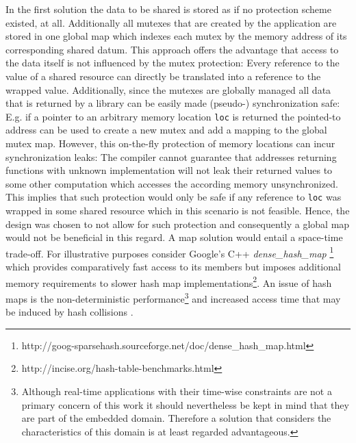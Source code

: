 In the first solution the data to be shared is stored as if no protection scheme existed, at all. Additionally all mutexes that are created by the application are stored in one global map which indexes each mutex by the memory address of its corresponding shared datum. This approach offers the advantage that access to the data itself is not influenced by the mutex protection: Every reference to the value of a shared resource  can directly be translated into a reference to the wrapped value. Additionally, since the mutexes are globally managed all data that is returned by a library can be easily made (pseudo-) synchronization safe: E.g. if a pointer to an arbitrary memory location \texttt{loc} is returned the pointed-to address can be used to create a new mutex and add a mapping to the global mutex map. However, this on-the-fly protection of memory locations can incur synchronization leaks: The compiler cannot guarantee that addresses returning functions with unknown implementation will not leak their returned values to some other computation which accesses the according memory unsynchronized. This implies that such protection would only be safe if any reference to \texttt{loc} was wrapped in some shared resource which in this scenario is not feasible. Hence, the design was chosen to not allow for such protection and consequently a global map would not be beneficial in this regard. A map solution would entail a space-time trade-off. For illustrative purposes consider Google's C++ \textit{dense\_hash\_map} \footnote{http://goog-sparsehash.sourceforge.net/doc/dense\_hash\_map.html} which provides comparatively fast access to its members but imposes additional memory requirements to slower hash map implementations\footnote{http://incise.org/hash-table-benchmarks.html}. An issue of hash maps is the non-deterministic performance\footnote{Although real-time applications with their time-wise constraints are not a primary concern of this work it should nevertheless be kept in mind that they are part of the embedded domain. Therefore a solution that considers the characteristics of this domain is at least regarded advantageous.} and increased access time that may be induced by hash collisions \cite{FastAndDeterministicHashTable}.

